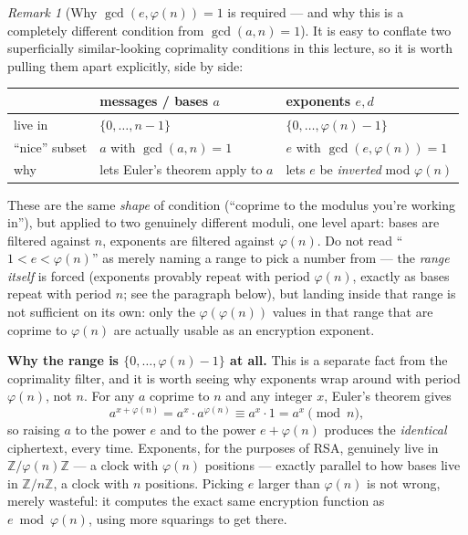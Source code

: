 \documentclass[11pt]{article}
\theoremstyle{definition}
\theoremstyle{remark}
\newtheorem{remark}[theorem]{Remark}
\begin{document}
\begin{remark}[Why $\gcd(e,\varphi(n))=1$ is required — and why this is a completely different condition from $\gcd(a,n)=1$]\label{rem:exponent-range}
It is easy to conflate two superficially similar-looking coprimality conditions in this lecture, so it is worth pulling them apart explicitly, side by side:
\begin{center}
\begin{tabular}{lll}
\toprule
& \textbf{messages / bases} $a$ & \textbf{exponents} $e,d$\\
\midrule
live in & $\{0,\dots,n-1\}$ & $\{0,\dots,\varphi(n)-1\}$\\
``nice'' subset & $a$ with $\gcd(a,n)=1$ & $e$ with $\gcd(e,\varphi(n))=1$\\
why & lets Euler's theorem apply to $a$ & lets $e$ be \emph{inverted} mod $\varphi(n)$\\
\bottomrule
\end{tabular}
\end{center}
These are the same \emph{shape} of condition (``coprime to the modulus you're working in''), but applied to two genuinely different moduli, one level apart: bases are filtered against $n$, exponents are filtered against $\varphi(n)$. Do not read ``$1<e<\varphi(n)$'' as merely naming a range to pick a number from — the \emph{range itself} is forced (exponents provably repeat with period $\varphi(n)$, exactly as bases repeat with period $n$; see the paragraph below), but landing inside that range is not sufficient on its own: only the $\varphi(\varphi(n))$ values in that range that are coprime to $\varphi(n)$ are actually usable as an encryption exponent.

\medskip\noindent\textbf{Why the range is $\{0,\dots,\varphi(n)-1\}$ at all.} This is a separate fact from the coprimality filter, and it is worth seeing why exponents wrap around with period $\varphi(n)$, not $n$. For any $a$ coprime to $n$ and any integer $x$, Euler's theorem gives
\[
a^{x+\varphi(n)} = a^x \cdot a^{\varphi(n)} \equiv a^x \cdot 1 = a^x \pmod n,
\]
so raising $a$ to the power $e$ and to the power $e+\varphi(n)$ produces the \emph{identical} ciphertext, every time. Exponents, for the purposes of RSA, genuinely live in $\mathbb{Z}/\varphi(n)\mathbb{Z}$ — a clock with $\varphi(n)$ positions — exactly parallel to how bases live in $\mathbb{Z}/n\mathbb{Z}$, a clock with $n$ positions. Picking $e$ larger than $\varphi(n)$ is not wrong, merely wasteful: it computes the exact same encryption function as $e \bmod \varphi(n)$, using more squarings to get there.


\end{remark}
\end{document}
